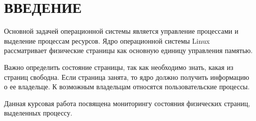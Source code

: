 \chapter*{ВВЕДЕНИЕ}

Основной задачей операционной системы является управление процессами и выделение процессам ресурсов. Ядро операционной системы Linux рассматривает физические страницы как основную единицу управления памятью.

Важно определить состояние страницы, так как необходимо знать, какая из страниц свободна. Если страница занята, то ядро должно получить информацию о ее владельце. К возможным владельцам относятся пользовательские процессы.

Данная курсовая работа посвящена мониторингу состояния физических страниц, выделенных процессу.
